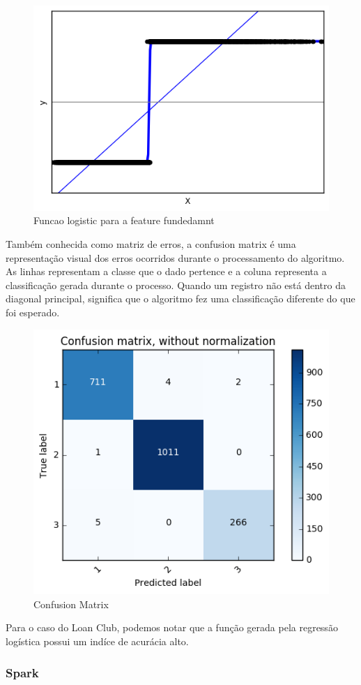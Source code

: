 \begin{figure}[!ht]
\caption{Funcao logistic para a feature fundedamnt}
\centerline{\includegraphics[width=.6\textwidth]{img/logit}}
\end{figure}

Também conhecida como matriz de erros, a confusion matrix é uma representação visual dos erros ocorridos durante o processamento do algoritmo. As linhas representam a classe que o dado pertence e a coluna representa a classificação gerada durante o processo. Quando um registro não está dentro da diagonal principal, significa que o algoritmo fez uma classificação diferente do que foi esperado.

\begin{figure}[!ht]
\caption{Confusion Matrix}
\centerline{\includegraphics[width=.6\textwidth]{img/confusionMatrix}}
\end{figure}


Para o caso do Loan Club, podemos notar que a função gerada pela regressão logística possui um indíce de acurácia alto.

\subsubsection{Spark}

